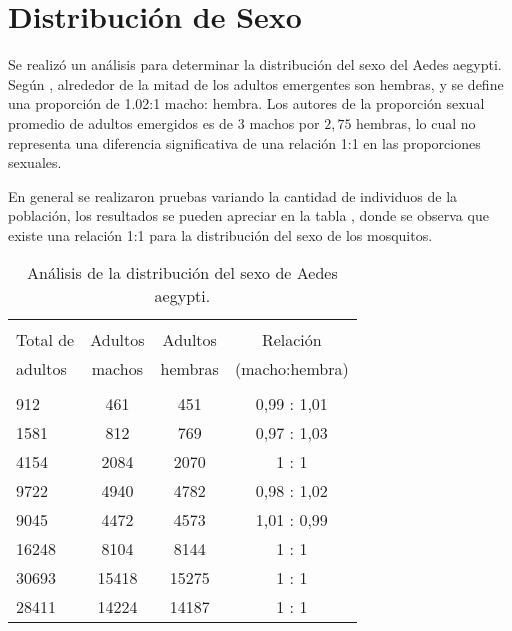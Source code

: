 \section{Distribución de Sexo}
Se realizó un análisis para determinar la distribución del sexo del Aedes aegypti. Según
\cite{otero2006stochastic}, alrededor de la mitad de los adultos emergentes son hembras, y se
define una proporción de 1.02:1 macho: hembra. Los autores de \cite{manrique1998desarrollo} la
proporción sexual promedio de adultos emergidos es de $3$ machos por $2,75$ hembras, lo cual no representa una diferencia significativa de una relación 1:1 en las proporciones sexuales.

En general se realizaron pruebas variando la cantidad de individuos de la población, los
resultados se pueden apreciar en la tabla , donde se observa que
existe una relación 1:1 para la distribución del sexo de los mosquitos.

\begin{table}
    \centering
        \caption{ \label{tab:distribucion-sexo-test} Análisis de la distribución del sexo de Aedes
        aegypti.}
        \begin{tabular}{l c c c }
            \hline \\
            Total de & Adultos & Adultos & Relación \\
            adultos  & machos  & hembras & (macho:hembra) \\
            \hline
            \hline \\
            912    &  461    &  451    &  0,99 : 1,01 \\
            1581   &  812    &  769    &  0,97 : 1,03 \\
            4154   &  2084   &  2070   &  1    : 1 \\
            9722   &  4940   &  4782   &  0,98 : 1,02 \\
            9045   &  4472   &  4573   &  1,01 : 0,99 \\
            16248  &  8104   &  8144   &  1    : 1 \\
            30693  &  15418  &  15275  &  1    : 1 \\
            28411  &  14224  &  14187  &  1    : 1 \\
        \end{tabular}
\end{table}
